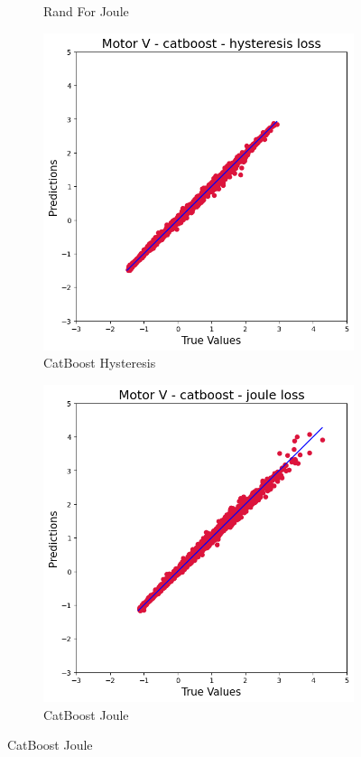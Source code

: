 \documentclass{article}
\begin{document}
\begin{figure}[!htbp]
\begin{subfigure}[b]{0.23\textwidth}
        \caption{Rand For Joule}
    \end{subfigure}
    \hfill
    \begin{subfigure}[b]{0.23\textwidth}
        \centering
        \includegraphics[width=\textwidth]{images/V/catboost_hysteresis.png}
        \caption{CatBoost Hysteresis}
    \end{subfigure}
    \hfill
    \begin{subfigure}[b]{0.23\textwidth}
        \centering
        \includegraphics[width=\textwidth]{images/V/catboost_joule.png}
        \caption{CatBoost Joule}
    \end{subfigure}
    

\end{figure}
\end{document}
